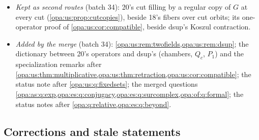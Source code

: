 \documentclass[11pt,oneside]{article}
\numberwithin{equation}{section}
\theoremstyle{definition}
\theoremstyle{remark}
\newcommand{\No}{\mathbf{No}}
\newcommand{\lbl}[1]{\nolinkurl{#1}}
\begin{document}
\begin{itemize}[itemsep=2pt]
Theorem~12.2 as \cref{opa:es:thm:complexmain}. Its difference core, which re-derives \lbl{dsup:lem:orbit}, \lbl{dsup:thm:resolvent},
\lbl{dsup:cor:fixed}, \lbl{dsup:cor:poly}, \lbl{dsup:thm:multsingle} and \lbl{dsup:cor:simultaneous} for class-sized double lifts, is printed
in \cref{opa:us:part} with each correspondence stated, since the single-dilation report states these only for set-sized fields and, on
$\No$, for rational dilations.
\item \emph{Kept as second routes} (batch 34): 20's cut filling by a regular copy of $G$ at every cut (\cref{opa:us:prop:cutcopies}), beside
18's fibers over cut orbits; its one-operator proof of \cref{opa:us:cor:compatible}, beside dsup's Koszul contraction.
\item \emph{Added by the merge} (batch 34): \cref{opa:us:rem:twofields,opa:us:rem:dsup}; the dictionary between 20's operators and dsup's
(chambers, $Q_c$, $P_1$) and the specialization remarks after \cref{opa:us:thm:multiplicative,opa:us:thm:retraction,opa:us:cor:compatible}; the
status note after \cref{opa:us:q:fixedsets}; the merged questions \cref{opa:as:q:exp,opa:es:q:conjugacy,opa:es:q:surcomplex,opa:of:q:formal}; the
status notes after \cref{opa:q:relative,opa:es:q:beyond}.
\end{itemize}

\subsection{Corrections and stale statements}\label{opa:sub:corrections}
\end{document}
